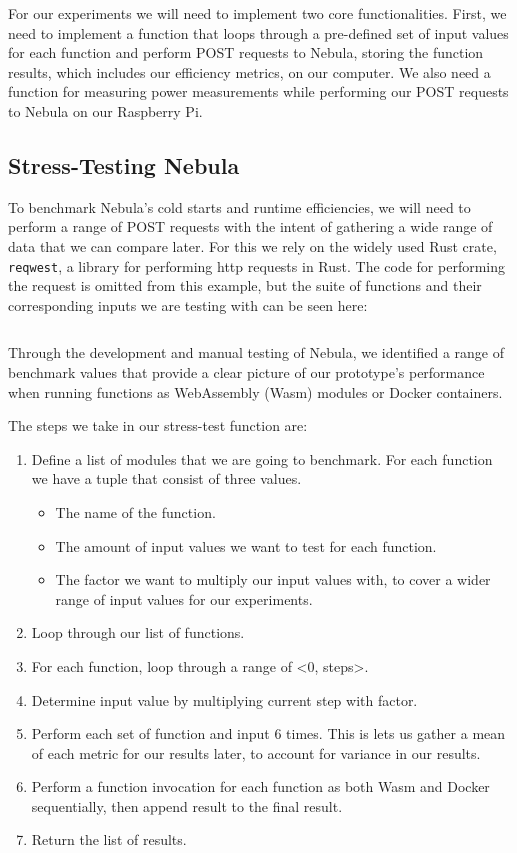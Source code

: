 \documentclass[
  table]{report}
\begin{document}
For our experiments we will need to implement two core functionalities.
First, we need to implement a function that loops through a pre-defined
set of input values for each function and perform POST requests to
Nebula, storing the function results, which includes our efficiency
metrics, on our computer. We also need a function for measuring power
measurements while performing our POST requests to Nebula on our
Raspberry Pi.

\subsection{Stress-Testing Nebula}
\label{sect:stress_test}

To benchmark Nebula's cold starts and runtime efficiencies, we will need
to perform a range of POST requests with the intent of gathering a wide
range of data that we can compare later. For this we rely on the widely
used Rust crate, \texttt{reqwest}, a library for performing http
requests in Rust. The code for performing the request is omitted from
this example, but the suite of functions and their corresponding inputs
we are testing with can be seen here:

\newpage

\inputminted{rust}{assets/code/request.rs}

Through the development and manual testing of Nebula, we identified a
range of benchmark values that provide a clear picture of our
prototype's performance when running functions as WebAssembly (Wasm)
modules or Docker containers.

The steps we take in our stress-test function are:

\renewcommand{\theenumi}{4.\arabic{enumi}}
\begin{enumerate}
  \item Define a list of modules that we are going to benchmark. For each function we have a tuple that consist of three values.  
    \begin{itemize}
      \item The name of the function.
      \item The amount of input values we want to test for each function.
      \item The factor we want to multiply our input values with, to cover a wider range of input values for our experiments. 
    \end{itemize}
  \item Loop through our list of functions.
  \item For each function, loop through a range of <0, steps>.
  \item Determine input value by multiplying current step with factor.
  \item Perform each set of function and input 6 times. This is lets us gather a mean of each metric for our results later, to account for variance in our results.
  \item Perform a function invocation for each function as both Wasm and Docker sequentially, then append result to the final result.
  \item Return the list of results.
\end{enumerate}
\end{document}
